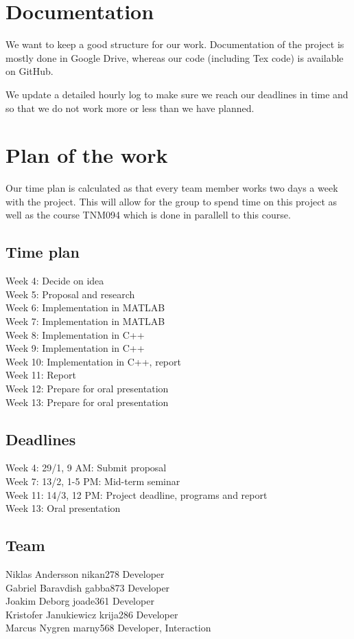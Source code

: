 \documentclass[a4paper,12pt,twoside,swedish]{report}
\begin{document}
\section{Documentation}
We want to keep a good structure for our work. Documentation of the project is mostly done in Google Drive, whereas our code (including Tex code) is available on GitHub.

We update a detailed hourly log to make sure we reach our deadlines in time and so that we do not work more or less than we have planned.

\section{Plan of the work}
Our time plan is calculated as that every team member works two days a week with the project. This will allow for the group to spend time on this project as well as the course TNM094 which is done in parallell to this course.

\subsection{Time plan}
Week 4: Decide on idea \\
Week 5: Proposal and research \\
Week 6: Implementation in MATLAB \\
Week 7: Implementation in MATLAB \\
Week 8: Implementation in C++ \\
Week 9: Implementation in C++ \\
Week 10: Implementation in C++, report \\
Week 11: Report \\
Week 12: Prepare for oral presentation \\
Week 13: Prepare for oral presentation

\subsection{Deadlines}
Week 4: 29/1, 9 AM: Submit proposal \\
Week 7: 13/2, 1-5 PM: Mid-term seminar \\
Week 11: 14/3, 12 PM: Project deadline, programs and report \\
Week 13: Oral presentation \\

 \subsection{Team}
Niklas Andersson	nikan278	Developer\\
Gabriel Baravdish	gabba873	Developer\\
Joakim Deborg	joade361	Developer\\
Kristofer Janukiewicz	krija286	Developer\\
Marcus Nygren	marny568	Developer, Interaction
\end{document}
